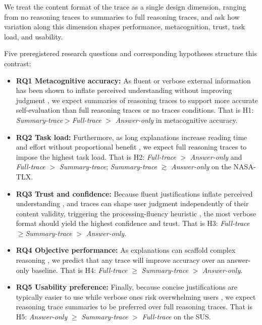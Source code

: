 \documentclass[manuscript,review,anonymous]{acmart}
\begin{document}

We treat the content format of the trace as a single design dimension, ranging from no reasoning traces to summaries to full reasoning traces, and ask how variation along this dimension shapes performance, metacognition, trust, task load, and usability. 

Five preregistered research questions and corresponding hypotheses structure this contrast:

\begin{itemize}
    \item \textbf{RQ1 Metacognitive accuracy:} As fluent or verbose external information has been shown to inflate perceived understanding without improving judgment \cite{fisher2021harder, alter2009uniting}, we expect summaries of reasoning traces to support more accurate self-evaluation than full reasoning traces or no traces conditions. That is H1: \textit{Summary-trace}$>$\textit{Full-trace} $>$ \textit{Answer-only} in metacognitive accuracy.
    \item \textbf{RQ2 Task load:} Furthermore, as long explanations increase reading time and effort without proportional benefit \cite{vasconcelos2023explanations, bertrand2022cognitive}, we expect full reasoning traces to impose the highest task load. That is H2: \textit{Full-trace} $>$ \textit{Answer-only} and \textit{Full-trace} $>$ \textit{Summary-trace}; \textit{Summary-trace} $\gtrsim$ \textit{Answer-only} on the NASA-TLX.
    \item \textbf{RQ3 Trust and confidence:} Because fluent justifications inflate perceived understanding \cite{fisher2021harder}, and traces can shape user judgment independently of their content validity, triggering the processing-fluency heuristic \cite{alter_overcoming_2007}, the most verbose format should yield the highest confidence and trust. That is H3: \textit{Full-trace} $\geq $\textit{Summary-trace} $>$ \textit{Answer-only}.
    \item \textbf{RQ4 Objective performance:} As explanations can scaffold complex reasoning \cite{10.1145/3411764.3445717,tankelevitch2023metacognitive}, we predict that any trace will improve accuracy over an answer-only baseline. That is H4: \textit{Full-trace} $\geq$ \textit{Summary-trace} $>$ \textit{Answer-only}.
    \item \textbf{RQ5 Usability preference:} Finally, because concise justifications are typically easier to use while verbose ones risk overwhelming users \cite{MILLER20191}, we expect reasoning trace summaries to be preferred over full reasoning traces. That is H5: \textit{Answer-only} $\geq$ \textit{Summary-trace} $>$ \textit{Full-trace} on the SUS.
\end{itemize}
\end{document}
